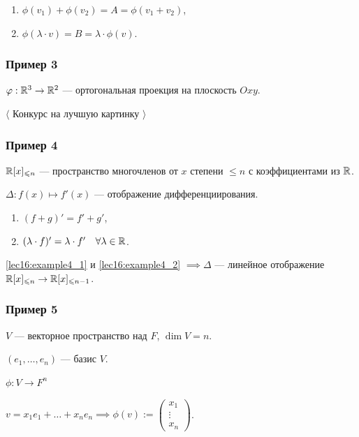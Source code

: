 \bigskip
\begin{enumerate}[label=\arabic*), nosep]
\item $\phi(v_1) + \phi(v_2) = A = \phi(v_1 + v_2)$,
\item $\phi(\lambda \cdot v) = B = \lambda \cdot \phi(v)$.
\end{enumerate}

\subsubsection{Пример 3}

$\varphi: \mathbb{R}^3 \to \mathbb{R}^2$ --- ортогональная проекция на плоскость $Oxy$.

\begin{center}
    $\langle$ Конкурс на лучшую картинку $\rangle$
\end{center}

\subsubsection{Пример 4}

$\mathbb{R}[x]_{\leqslant n}$ --- пространство многочленов от $x$ степени $\leq n$ с коэффициентами из $\mathbb{R}$.

$\Delta : f(x) \mapsto f'(x)$ --- отображение дифференциирования.

\bigskip
\begin{enumerate}[label=\arabic*), nosep]
\item \label{lec16:example4_1} $(f + g)' = f' + g'$,
\item \label{lec16:example4_2} $(\lambda \cdot f)' = \lambda \cdot f' \quad \forall \lambda \in \mathbb{R}$.
\end{enumerate}

\bigskip
\ref{lec16:example4_1} и \ref{lec16:example4_2} $\implies \Delta $ --- линейное отображение $\mathbb{R}[x]_{\leqslant n} \to \mathbb{R}[x]_{\leqslant n - 1}$.

\subsubsection{Пример 5}
\label{lec16:example_5}

$V$ --- векторное пространство над $F$, $\dim V = n$.

$(e_1, \dots, e_n)$ --- базис $V$.

$\phi : V \to F^n$

$v = x_1 e_1 + \dots + x_n e_n \implies \phi(v) := \begin{pmatrix} x_1 \\ \vdots \\ x_n \end{pmatrix}$.

